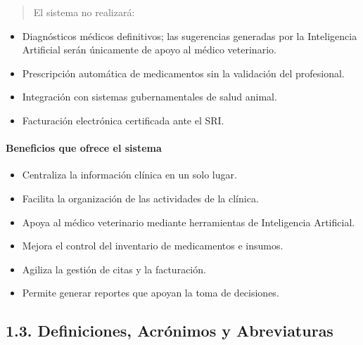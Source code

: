 \documentclass[
]{article}
\begin{document}
\begin{quote}
El sistema no realizará:
\end{quote}

\begin{itemize}
\item
  Diagnósticos médicos definitivos; las sugerencias generadas por la
  Inteligencia Artificial serán únicamente de apoyo al médico
  veterinario.
\item
  Prescripción automática de medicamentos sin la validación del
  profesional.
\item
  Integración con sistemas gubernamentales de salud animal.
\item
  Facturación electrónica certificada ante el SRI.
\end{itemize}

\paragraph{Beneficios que ofrece el
sistema}\label{beneficios-que-ofrece-el-sistema}

\begin{itemize}
\item
  Centraliza la información clínica en un solo lugar.
\item
  Facilita la organización de las actividades de la clínica.
\item
  Apoya al médico veterinario mediante herramientas de Inteligencia
  Artificial.
\item
  Mejora el control del inventario de medicamentos e insumos.
\item
  Agiliza la gestión de citas y la facturación.
\item
  Permite generar reportes que apoyan la toma de decisiones.
\end{itemize}

\subsection{1.3. Definiciones, Acrónimos y
Abreviaturas}\label{definiciones-acruxf3nimos-y-abreviaturas}
\end{document}
